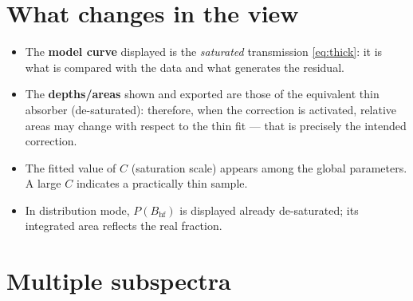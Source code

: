 \documentclass[11pt,a4paper]{article}
\newcommand{\BHF}{B_{\mathrm{hf}}}
\begin{document}
\section{What changes in the view}

\begin{itemize}[leftmargin=*]
  \item The \textbf{model curve} displayed is the \emph{saturated} transmission
        \eqref{eq:thick}: it is what is compared with the data and what generates
        the residual.
  \item The \textbf{depths/areas} shown and exported are those of the equivalent
        thin absorber (de-saturated): therefore, when the correction is activated,
        relative areas may change with respect to the thin fit — that is precisely
        the intended correction.
  \item The fitted value of $C$ (saturation scale) appears among the global
        parameters. A large $C$ indicates a practically thin sample.
  \item In distribution mode, $P(\BHF)$ is displayed already de-saturated; its
        integrated area reflects the real fraction.
\end{itemize}

\section{Multiple subspectra}
\end{document}
